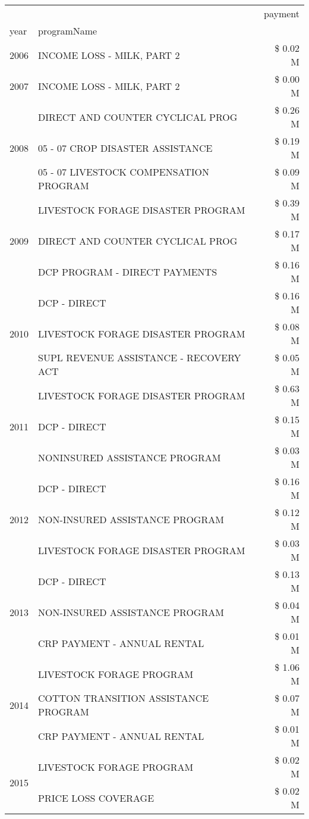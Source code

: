 \begin{tabular}{llr}
\toprule
 &  & payment \\
year & programName &  \\
\midrule
2006 & INCOME LOSS - MILK, PART 2 & \$ 0.02 M \\
\cline{1-3}
2007 & INCOME LOSS - MILK, PART 2 & \$ 0.00 M \\
\cline{1-3}
\multirow[t]{3}{*}{2008} & DIRECT AND COUNTER CYCLICAL PROG & \$ 0.26 M \\
 & 05 - 07 CROP DISASTER ASSISTANCE & \$ 0.19 M \\
 & 05 - 07 LIVESTOCK COMPENSATION PROGRAM & \$ 0.09 M \\
\cline{1-3}
\multirow[t]{3}{*}{2009} & LIVESTOCK FORAGE DISASTER  PROGRAM & \$ 0.39 M \\
 & DIRECT AND COUNTER CYCLICAL PROG & \$ 0.17 M \\
 & DCP PROGRAM - DIRECT PAYMENTS & \$ 0.16 M \\
\cline{1-3}
\multirow[t]{3}{*}{2010} & DCP - DIRECT & \$ 0.16 M \\
 & LIVESTOCK FORAGE DISASTER PROGRAM & \$ 0.08 M \\
 & SUPL REVENUE ASSISTANCE - RECOVERY ACT & \$ 0.05 M \\
\cline{1-3}
\multirow[t]{3}{*}{2011} & LIVESTOCK FORAGE DISASTER PROGRAM & \$ 0.63 M \\
 & DCP - DIRECT & \$ 0.15 M \\
 & NONINSURED ASSISTANCE PROGRAM & \$ 0.03 M \\
\cline{1-3}
\multirow[t]{3}{*}{2012} & DCP - DIRECT & \$ 0.16 M \\
 & NON-INSURED ASSISTANCE PROGRAM & \$ 0.12 M \\
 & LIVESTOCK FORAGE DISASTER PROGRAM & \$ 0.03 M \\
\cline{1-3}
\multirow[t]{3}{*}{2013} & DCP - DIRECT & \$ 0.13 M \\
 & NON-INSURED ASSISTANCE PROGRAM & \$ 0.04 M \\
 & CRP PAYMENT - ANNUAL RENTAL & \$ 0.01 M \\
\cline{1-3}
\multirow[t]{3}{*}{2014} & LIVESTOCK FORAGE PROGRAM & \$ 1.06 M \\
 & COTTON TRANSITION ASSISTANCE PROGRAM & \$ 0.07 M \\
 & CRP PAYMENT - ANNUAL RENTAL & \$ 0.01 M \\
\cline{1-3}
\multirow[t]{3}{*}{2015} & LIVESTOCK FORAGE PROGRAM & \$ 0.02 M \\
 & PRICE LOSS COVERAGE & \$ 0.02 M \\

\end{tabular}
